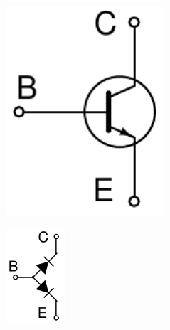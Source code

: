 \documentclass[beamer]{standalone}
\begin{document}
\begin{frame}
\begin{columns}[t]
\begin{column}{.5\textwidth}
\begin{columns}[t]
\begin{column}{.40\textwidth}
   \end{column}
   \begin{column}{.60\textwidth}
    \begin{figure}
     \includegraphics[width=0.80\textwidth]{./schematics/npn_transistor.pdf}
    \end{figure}
    \begin{figure}
     \includegraphics[width=0.30\textwidth]{./schematics/npn_diodes.pdf}
    \end{figure}
   \end{column}
  \end{columns}


\end{column}
\end{columns}
\end{frame}
\end{document}
